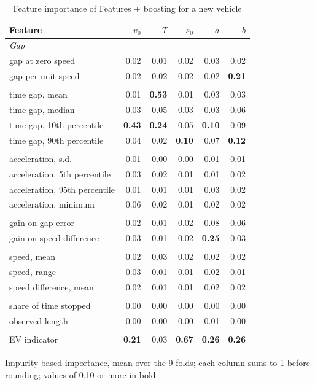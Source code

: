 \begin{table}[t]
\centering
\footnotesize
\setlength{\tabcolsep}{4pt}
\caption{Feature importance of Features + boosting for a new vehicle}
\label{tab:gbm_importance}
\begin{tabular}{lrrrrr}
\toprule
Feature & $v_0$ & $T$ & $s_0$ & $a$ & $b$ \\
\midrule
\multicolumn{6}{l}{\textit{Gap}} \\
gap at zero speed & 0.02 & 0.01 & 0.02 & 0.03 & 0.02 \\
gap per unit speed & 0.02 & 0.02 & 0.02 & 0.02 & \textbf{0.21} \\
\addlinespace
\multicolumn{6}{l}{\textit{Time gap}} \\
time gap, mean & 0.01 & \textbf{0.53} & 0.01 & 0.03 & 0.03 \\
time gap, median & 0.03 & 0.05 & 0.03 & 0.03 & 0.06 \\
time gap, 10th percentile & \textbf{0.43} & \textbf{0.24} & 0.05 & \textbf{0.10} & 0.09 \\
time gap, 90th percentile & 0.04 & 0.02 & \textbf{0.10} & 0.07 & \textbf{0.12} \\
\addlinespace
\multicolumn{6}{l}{\textit{Acceleration}} \\
acceleration, s.d. & 0.01 & 0.00 & 0.00 & 0.01 & 0.01 \\
acceleration, 5th percentile & 0.03 & 0.02 & 0.01 & 0.01 & 0.02 \\
acceleration, 95th percentile & 0.01 & 0.01 & 0.01 & 0.03 & 0.02 \\
acceleration, minimum & 0.06 & 0.02 & 0.01 & 0.02 & 0.02 \\
\addlinespace
\multicolumn{6}{l}{\textit{Feedback gains}} \\
gain on gap error & 0.02 & 0.01 & 0.02 & 0.08 & 0.06 \\
gain on speed difference & 0.03 & 0.01 & 0.02 & \textbf{0.25} & 0.03 \\
\addlinespace
\multicolumn{6}{l}{\textit{Speed}} \\
speed, mean & 0.02 & 0.03 & 0.02 & 0.02 & 0.02 \\
speed, range & 0.03 & 0.01 & 0.01 & 0.02 & 0.01 \\
speed difference, mean & 0.02 & 0.01 & 0.01 & 0.02 & 0.02 \\
\addlinespace
\multicolumn{6}{l}{\textit{Context}} \\
share of time stopped & 0.00 & 0.00 & 0.00 & 0.00 & 0.00 \\
observed length & 0.00 & 0.00 & 0.00 & 0.01 & 0.00 \\
\addlinespace
\multicolumn{6}{l}{\textit{Powertrain}} \\
EV indicator & \textbf{0.21} & 0.03 & \textbf{0.67} & \textbf{0.26} & \textbf{0.26} \\
\bottomrule
\end{tabular}
\par\smallskip
\parbox{\linewidth}{\footnotesize Impurity-based importance, mean over the 9 folds; each column sums to 1 before rounding; values of 0.10 or more in bold.}
\end{table}
